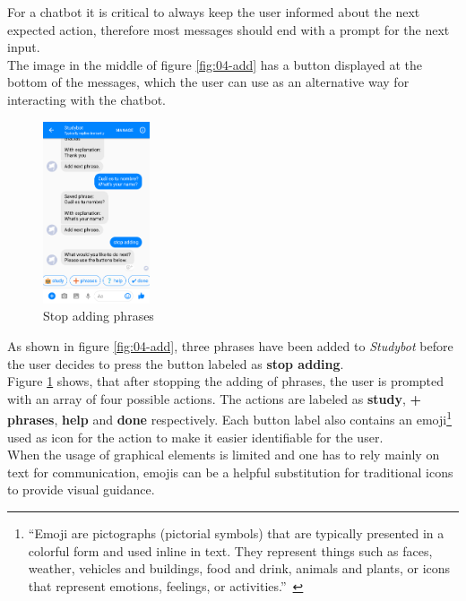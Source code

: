 For a chatbot it is critical to always keep the user informed about the next expected action,
therefore most messages should end with a prompt for the next input.
\\

The image in the middle of figure \ref{fig:04-add} has a button displayed at the bottom of the messages,
which the user can use as an alternative way for interacting with the chatbot.
\\

\begin{figure}
  \centering
  \includegraphics[width=0.28\textwidth]{images/interface/05-stop-adding.png}
	\caption{Stop adding phrases}
	\label{fig:05-stop-adding}
\end{figure}

As shown in figure \ref{fig:04-add}, three phrases have been added to \emph{Studybot}
before the user decides to press the button labeled as \textbf{stop adding}.
\\
Figure \ref{fig:05-stop-adding} shows, that after stopping the adding of phrases, the user is prompted with an array of four possible actions.
The actions are labeled as \textbf{study}, \textbf{+ phrases}, \textbf{help} and \textbf{done} respectively.
Each button label also contains an emoji\footnote{``Emoji are pictographs (pictorial symbols) that are typically presented in a colorful form and used inline in text. They represent things such as faces, weather, vehicles and buildings, food and drink, animals and plants, or icons that represent emotions, feelings, or activities.''~\cite{emoji}} used as icon for the action to make it easier identifiable for the user.
\\
When the usage of graphical elements is limited and one has to rely mainly on text for communication,
emojis can be a helpful substitution for traditional icons to provide visual guidance.
\\

